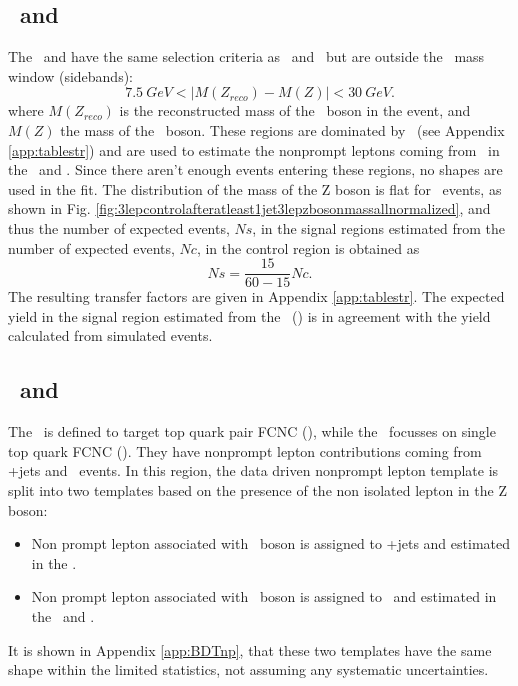 \subsection{\TTCR\ and \STCR}
The \TTCR\ and \STCR have the same selection criteria as \TTSR\ and \STSR\, but are outside the \PZ\ mass window (sidebands): 
\begin{equation}
7.5 \: GeV < |M(Z_{reco}) - M(Z)| < 30 \:GeV. 
\end{equation}
where $M(Z_{reco})$ is the reconstructed mass of the \PZ\ boson in the event, and $M(Z)$ the mass of the \PZ\ boson.
These regions are dominated by \ttbar\ (see Appendix \ref{app:tablestr}) and are used to estimate the nonprompt  leptons coming from \ttbar\ in the \STSR\ and \TTSR. Since there aren't enough events entering these regions, no shapes are used in the fit. The distribution of the mass of the Z boson is flat for \ttbar\ events, as shown in Fig. \ref{fig:3lepcontrolafteratleast1jet3lepzbosonmassallnormalized},  and thus the number of expected events, $Ns$, in the signal regions estimated from the number of expected events, $Nc$, in the control region is obtained as
\begin{equation}
Ns = \frac{15}{60-15} Nc.
\end{equation}
The resulting transfer factors are given in Appendix \ref{app:tablestr}. The expected yield in the signal region estimated from the \TTCR\ (\STCR) is in agreement with the yield calculated from simulated events. 



\subsection{\TTSR\ and \STSR}
The \TTSR\ is defined to target top quark pair FCNC (\tZq), while the \STSR\ focusses on single top quark FCNC (\tZ). They have nonprompt  lepton contributions coming from \DY+jets and \ttbar\ events. In this region, the data driven nonprompt  lepton template is split into two templates based on the presence of the non isolated lepton in the Z boson: 
\begin{itemize}
	\item Non prompt lepton associated with \PW\ boson is assigned to \DY+jets and estimated in the \WZCR.
	\item Non prompt lepton associated with \PZ\ boson is assigned to \ttbar\ and estimated in the \TTCR\ and \STCR.
\end{itemize}
It is shown in Appendix \ref{app:BDTnp}, that these two templates have the same shape within the limited statistics, not assuming any systematic uncertainties. 

